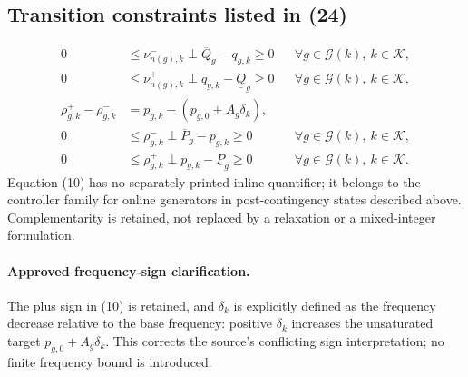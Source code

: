 \documentclass{article}
\begin{document}
\subsection*{Transition constraints listed in (24)}
\begin{align}
0&\leq\nu_{n(g),k}^{-}\perp\overline Q_g-q_{g,k}\geq0
&&\forall g\in\mathcal G(k),\ k\in\mathcal K,\tag{8}\\
0&\leq\nu_{n(g),k}^{+}\perp q_{g,k}-\underline Q_g\geq0
&&\forall g\in\mathcal G(k),\ k\in\mathcal K,\tag{9}\\
\rho_{g,k}^{+}-\rho_{g,k}^{-}
&=p_{g,k}-(p_{g,0}+A_g\delta_k),\tag{10}\\
0&\leq\rho_{g,k}^{-}\perp\overline P_g-p_{g,k}\geq0
&&\forall g\in\mathcal G(k),\ k\in\mathcal K,\tag{11}\\
0&\leq\rho_{g,k}^{+}\perp p_{g,k}-\underline P_g\geq0
&&\forall g\in\mathcal G(k),\ k\in\mathcal K.\tag{12}
\end{align}
Equation (10) has no separately printed inline quantifier; it belongs to the controller family for online generators in post-contingency states described above. Complementarity is retained, not replaced by a relaxation or a mixed-integer formulation.

\paragraph{Approved frequency-sign clarification.}
The plus sign in (10) is retained, and $\delta_k$ is explicitly defined as the frequency decrease relative to the base frequency: positive $\delta_k$ increases the unsaturated target $p_{g,0}+A_g\delta_k$. This corrects the source's conflicting sign interpretation; no finite frequency bound is introduced.
\end{document}
